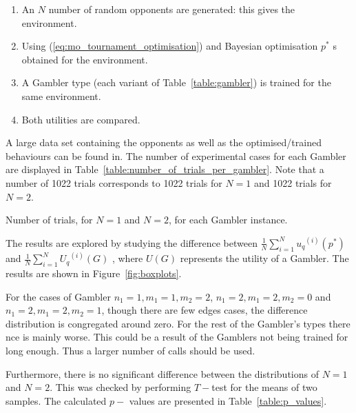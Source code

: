 \documentclass[10pt]{article}
\begin{document}
\begin{enumerate}
    \item An \(N\) number of random opponents are generated: this gives the
        environment.
    \item Using (\ref{eq:mo_tournament_optimisation}) and Bayesian optimisation \(p^*\) 
s obtained for the environment.
    \item A Gambler type (each variant of Table~\ref{table:gambler}) is trained for the same environment.
    \item Both utilities are compared.
\end{enumerate}

A large data set containing the opponents as well as the optimised/trained behaviours
can be found in. %
The number of experimental cases for each Gambler are displayed in Table~\ref{table:number_of_trials_per_gambler}.
Note that a number of 1022 trials corresponds to 1022 trials for \(N=1\) and 1022
trials for \(N=2\).

\begin{table}[htbp]
    \begin{center}
    
    \caption{Number of trials, for \(N=1\) and \(N=2\), for each Gambler instance.}
    \label{table:number_of_trials_per_gambler}
    \end{center}
\end{table}

The results are explored by studying the difference between
\(\frac{1}{N} \sum\limits_{i=1} ^ {N} {u_q}^{(i)} (p ^ *)\) and
\(\frac{1}{N} \sum\limits_{i=1} ^ {N} {U_q}^{(i)} (G)\) ,
where \(U(G)\) represents the utility of a Gambler. The results are shown in
Figure~\ref{fig:boxplots}.

For the cases of Gambler \(n_1=1, m_1=1, m_2=2\), \(n_1=2, m_1=2, m_2=0\) and
\(n_1=2, m_1=2, m_2=1\), though there are few edges cases, the difference distribution
is congregated around zero. For the rest of the Gambler's types there nce is mainly worse.
This could be a result of the Gamblers not being trained for long enough. Thus a larger
number of calls should be used. %

Furthermore, there is no significant difference between the distributions of
\(N=1\) and \(N=2\). This was checked by performing \(T-\)test for the means of two
samples. The calculated \(p-\) values are presented in Table~\ref{table:p_values}.
\end{document}
